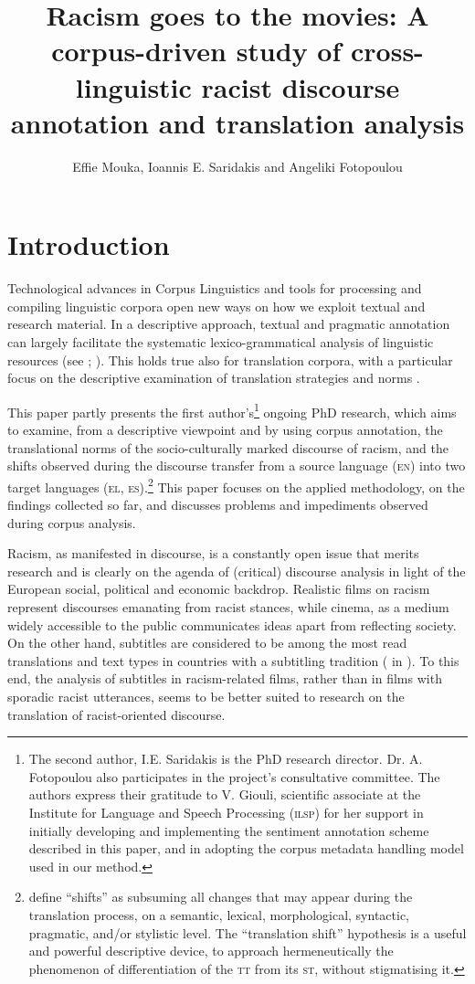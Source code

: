 \documentclass[output=paper]{LSP/langsci}
\author{Effie Mouka, Ioannis E. Saridakis and Angeliki Fotopoulou}
\title{Racism goes to the movies: A corpus-driven study of cross-linguistic racist discourse annotation and translation analysis}
\begin{document}
\section{Introduction} \label{sec:2:1}
Technological advances in Corpus Linguistics and tools for processing and compiling linguistic corpora open new ways on how we exploit textual and research material. In a descriptive approach, textual and pragmatic annotation can largely facilitate the systematic lexico-grammatical analysis of linguistic resources (see \citealt[29--31]{EneryHardie2012}; \citealt[76--79]{Zanettin2012}). This holds true also for translation corpora, with a particular focus on the descriptive examination of translation strategies and norms \citep[78--96]{Zanettin2012}.

This paper partly presents the first author's\footnote{The second author, I.E. Saridakis is the PhD research director. Dr. A. Fotopoulou also participates in the project's consultative committee. The authors express their gratitude to V. Giouli, scientific associate at the Institute for Language and Speech Processing (\textsc{ilsp}) for her support in initially developing and implementing the sentiment annotation scheme described in this paper, and in adopting the corpus metadata handling model used in our method.} ongoing PhD research, which aims to examine, from a descriptive viewpoint and by using corpus annotation, the translational norms of the socio-culturally marked discourse of racism, and the shifts observed during the discourse transfer from a source language (\textsc{en}) into two target languages (\textsc{el}, \textsc{es}).\footnote{\citet[120--121]{Batsalia2010} define “shifts” as subsuming all changes that may appear during the translation process, on a semantic, lexical, morphological, syntactic, pragmatic, and/or stylistic level. The “translation shift” hypothesis is a useful and powerful descriptive device, to approach hermeneutically the phenomenon of differentiation of the \textsc{tt} from its \textsc{st}, without stigmatising it.} This paper focuses on the applied methodology, on the findings collected so far, and discusses problems and impediments observed during corpus analysis.

Racism, as manifested in discourse, is a constantly open issue that merits research \citep{Dijk1993,Reisigl2001} and is clearly on the agenda of (critical) discourse analysis in light of the European social, political and economic backdrop. Realistic films on racism represent discourses emanating from racist stances, while cinema, as a medium widely accessible to the public communicates ideas apart from reflecting society. On the other hand, subtitles are considered to be among the most read translations and text types in countries with a subtitling tradition (\citealt[153]{Gottlieb1997} in \citealt[125]{Pedersen2011}). To this end, the analysis of subtitles in racism-related films, rather than in films with sporadic racist utterances, seems to be better suited to research on the translation of racist-oriented discourse.
\end{document}
